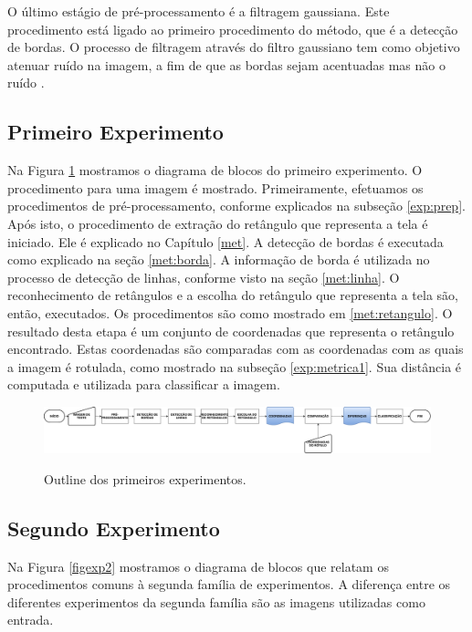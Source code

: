 
O último estágio de pré-processamento é a filtragem gaussiana. Este procedimento está ligado ao primeiro procedimento do método, que é a detecção de bordas. O processo de filtragem através do filtro gaussiano tem como objetivo atenuar ruído na imagem, a fim de que as bordas sejam acentuadas mas não o ruído \cite{canny,borda00}.

\subsection{Primeiro Experimento} \label{exp:proc1}

Na Figura \ref{fig:exp1} mostramos o diagrama de blocos do primeiro experimento. O procedimento para uma imagem é mostrado. Primeiramente, efetuamos os procedimentos de pré-processamento, conforme explicados na subseção \ref{exp:prep}. Após isto, o procedimento de extração do retângulo que representa a tela é iniciado. Ele é explicado no Capítulo \ref{met}. A detecção de bordas é executada como explicado na seção \ref{met:borda}. A informação de borda é utilizada no processo de detecção de linhas, conforme visto na seção \ref{met:linha}. O reconhecimento de retângulos e a escolha do retângulo que representa a tela são, então, executados. Os procedimentos são como mostrado em \ref{met:retangulo}. O resultado desta etapa é um conjunto de coordenadas que representa o retângulo encontrado. Estas coordenadas são comparadas com as coordenadas com as quais a imagem é rotulada, como mostrado na subseção \ref{exp:metrica1}. Sua distância é computada e utilizada para classificar a imagem.

\begin{figure} [h]
\centering
\includegraphics[width = \textwidth]{figuras/exp1.pdf} \label{fig:exp1} \caption{Outline dos primeiros experimentos.}
\end{figure} 


\subsection{Segundo Experimento} \label{exp:proc2}

Na Figura \ref{figexp2} mostramos o diagrama de blocos que relatam os procedimentos comuns à segunda família de experimentos. A diferença entre os diferentes experimentos da segunda família são as imagens utilizadas como entrada.

